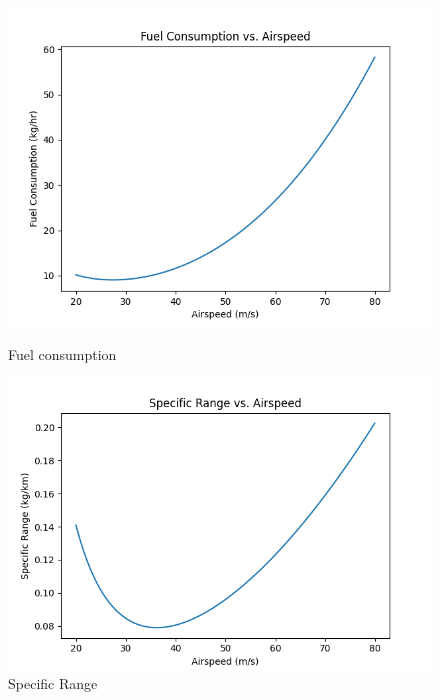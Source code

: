 \documentclass[letterpaper,12pt]{article}
\begin{document}
\begin{figure}[H]
\centering
    \begin{minipage}{0.45\textwidth}
        \centering
        \includegraphics[scale=0.5]{perf_fuel} %
        \caption{Fuel consumption}
    \end{minipage}
    \begin{minipage}{0.5\textwidth}
        \centering
        \includegraphics[scale=0.5]{perf_range} %
        \caption{Specific Range}
    \end{minipage}
\end{figure}
\end{document}
